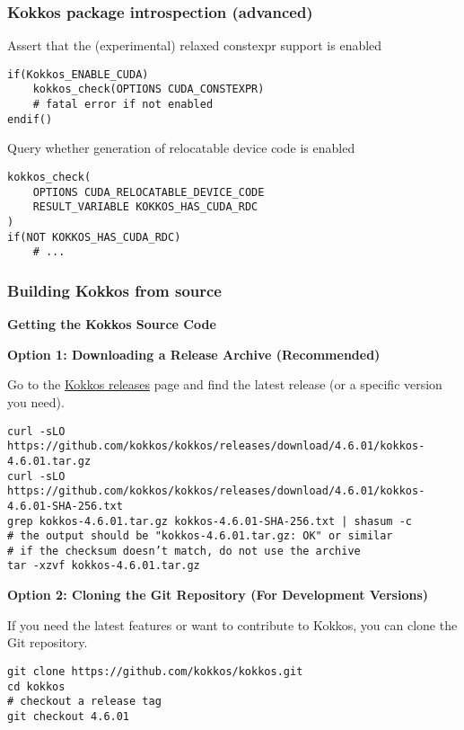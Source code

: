 \begin{frame}[fragile]
\frametitle{Kokkos package introspection (advanced)}

Assert that the (experimental) relaxed constexpr support is enabled
\begin{verbatim}
if(Kokkos_ENABLE_CUDA)
    kokkos_check(OPTIONS CUDA_CONSTEXPR)
    # fatal error if not enabled
endif()
\end{verbatim}

\vspace{1eM}
Query whether generation of relocatable device code is enabled
\begin{verbatim}
kokkos_check(
    OPTIONS CUDA_RELOCATABLE_DEVICE_CODE
    RESULT_VARIABLE KOKKOS_HAS_CUDA_RDC
)
if(NOT KOKKOS_HAS_CUDA_RDC)
    # ...
\end{verbatim}

\end{frame}

\begin{frame}[fragile]
\frametitle{Building Kokkos from source}
\textbf{Getting the Kokkos Source Code}

\scriptsize

\vspace{1eM}
\textbf{Option 1: Downloading a Release Archive (Recommended)}

Go to the \href{https://github.com/kokkos/kokkos/releases}{Kokkos releases} page and find the latest release (or a specific version you need).
\begin{verbatim}
curl -sLO https://github.com/kokkos/kokkos/releases/download/4.6.01/kokkos-4.6.01.tar.gz
curl -sLO https://github.com/kokkos/kokkos/releases/download/4.6.01/kokkos-4.6.01-SHA-256.txt
grep kokkos-4.6.01.tar.gz kokkos-4.6.01-SHA-256.txt | shasum -c
# the output should be "kokkos-4.6.01.tar.gz: OK" or similar
# if the checksum doesn’t match, do not use the archive
tar -xzvf kokkos-4.6.01.tar.gz
\end{verbatim}

\vspace{1eM}
\textbf{Option 2: Cloning the Git Repository (For Development Versions)}

If you need the latest features or want to contribute to Kokkos, you can clone the Git repository.
\begin{verbatim}
git clone https://github.com/kokkos/kokkos.git
cd kokkos
# checkout a release tag
git checkout 4.6.01
\end{verbatim}

\end{frame}

